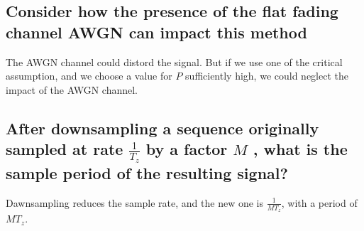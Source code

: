 \documentclass[frenchb, oneside, headings=normal]{scrartcl}
\begin{document}
\subsection{Consider how the presence of the flat fading channel AWGN can impact this method}

The AWGN channel could distord the signal. But if we use one of the critical assumption, and we choose a value for $P$ sufficiently high, we could neglect the impact of the AWGN channel.

\subsection{After downsampling a sequence originally sampled at rate $\frac{1}{T_z}$ by a factor $M$ , what is the sample period of the resulting signal?}

Dawnsampling reduces the sample rate, and the new one is $\frac{1}{MT_z}$, with a period of $MT_z$.
 
\end{document}
